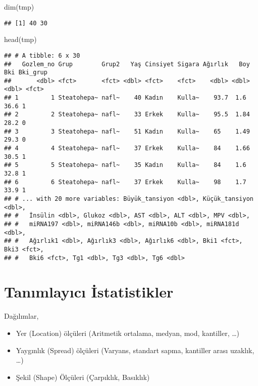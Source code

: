 \documentclass[
]{article}
\newenvironment{Shaded}{\begin{snugshade}}{\end{snugshade}}
\newcommand{\FunctionTok}[1]{\textcolor[rgb]{0.00,0.00,0.00}{#1}}
\newcommand{\NormalTok}[1]{#1}
\providecommand{\tightlist}{%
  \setlength{\itemsep}{0pt}\setlength{\parskip}{0pt}}
\begin{document}
\begin{Shaded}
\begin{Highlighting}[]
\FunctionTok{dim}\NormalTok{(tmp)}
\end{Highlighting}
\end{Shaded}

\begin{verbatim}
## [1] 40 30
\end{verbatim}

\begin{Shaded}
\begin{Highlighting}[]
\FunctionTok{head}\NormalTok{(tmp)}
\end{Highlighting}
\end{Shaded}

\begin{verbatim}
## # A tibble: 6 x 30
##   Gozlem_no Grup        Grup2   Yaş Cinsiyet Sigara Ağırlık   Boy   Bki Bki_grup
##       <dbl> <fct>       <fct> <dbl> <fct>    <fct>    <dbl> <dbl> <dbl> <fct>   
## 1         1 Steatohepa~ nafl~    40 Kadın    Kulla~    93.7  1.6   36.6 1       
## 2         2 Steatohepa~ nafl~    33 Erkek    Kulla~    95.5  1.84  28.2 0       
## 3         3 Steatohepa~ nafl~    51 Kadın    Kulla~    65    1.49  29.3 0       
## 4         4 Steatohepa~ nafl~    37 Erkek    Kulla~    84    1.66  30.5 1       
## 5         5 Steatohepa~ nafl~    35 Kadın    Kulla~    84    1.6   32.8 1       
## 6         6 Steatohepa~ nafl~    37 Erkek    Kulla~    98    1.7   33.9 1       
## # ... with 20 more variables: Büyük_tansiyon <dbl>, Küçük_tansiyon <dbl>,
## #   İnsülin <dbl>, Glukoz <dbl>, AST <dbl>, ALT <dbl>, MPV <dbl>,
## #   miRNA197 <dbl>, miRNA146b <dbl>, miRNA10b <dbl>, miRNA181d <dbl>,
## #   Ağırlık1 <dbl>, Ağırlık3 <dbl>, Ağırlık6 <dbl>, Bki1 <fct>, Bki3 <fct>,
## #   Bki6 <fct>, Tg1 <dbl>, Tg3 <dbl>, Tg6 <dbl>
\end{verbatim}

\par\medskip

\hypertarget{tanux131mlayux131cux131-istatistikler}{%
\section{Tanımlayıcı
İstatistikler}\label{tanux131mlayux131cux131-istatistikler}}

Dağılımlar,

\begin{itemize}
\tightlist
\item
  Yer (Location) ölçüleri (Aritmetik ortalama, medyan, mod, kantiller,
  \ldots)
\item
  Yaygınlık (Spread) ölçüleri (Varyans, standart sapma, kantiller arası
  uzaklık, \ldots)
\item
  Şekil (Shape) Ölçüleri (Çarpıklık, Basıklık)
\end{itemize}
\end{document}
